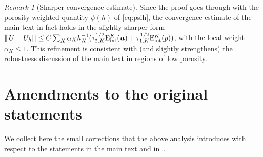 \documentclass[11pt,a4paper]{article}
\newcommand{\bu}{\boldsymbol{u}}
\newcommand{\triplenorm}[1]{{\lvert\kern-0.25ex\lvert\kern-0.25ex\lvert #1
\rvert\kern-0.25ex\rvert\kern-0.25ex\rvert}}
\newcommand{\Eint}[2]{\mathrm{E}^{#1}_{\mathrm{int}}(#2)}
\theoremstyle{plain}
\theoremstyle{remark}
\newtheorem{remark}[lemma]{Remark}
\theoremstyle{definition}
\numberwithin{equation}{section}
\begin{document}
\begin{remark}[Sharper convergence estimate]\label{rem:sharperconv}
Since the proof goes through with the porosity-weighted quantity $\psi(h)$ of
\eqref{eq:psih}, the convergence estimate of the main text in fact holds in the slightly
sharper form $\triplenorm{U-U_h}\le C\sum_K \alpha_K h_K^{-1}
(\tau_{2,K}^{1/2}\Eint{K}{\bu}+\tau_{1,K}^{1/2}\Eint{K}{p})$, with the local weight
$\alpha_K\le1$. This refinement is consistent with (and slightly strengthens) the
robustness discussion of the main text in regions of low porosity.
\end{remark}

\section{Amendments to the original statements}\label{sec:amendments}

We collect here the small corrections that the above analysis introduces with respect to
the statements in the main text and in~\cite{codina2001}.
\end{document}
